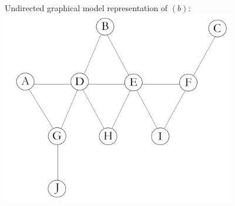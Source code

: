 \documentclass[12pt,letterpaper]{article}
\begin{document}
\begin{enumerate}[label={(\alph*) }]
        Undirected graphical model representation of $(b):$\\
        \includegraphics[width=4in]{2d_b.png}
        \end{enumerate}
\end{document}
